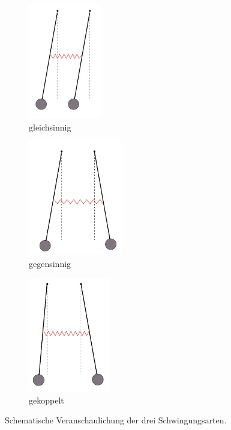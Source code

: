 \begin{figure}
    \begin{subfigure}{0.31\textwidth}
      \centering
      \includegraphics[height=5cm]{content/Bilder/Gleichsinnig.png}
      \caption{gleichsinnig}
      \label{fig:gleichsinnig}
    \end{subfigure}
    \hfill
    \begin{subfigure}{0.31\textwidth}
      \centering
      \includegraphics[height=5cm]{content/Bilder/Gegensinnig.png}
      \caption{gegensinnig}
      \label{fig:gegensinnig}
    \end{subfigure}
    \hfill
    \begin{subfigure}{0.31\textwidth}
      \centering
      \includegraphics[height=5cm]{content/Bilder/Gekoppelt.png}
      \caption{gekoppelt}
      \label{fig:gekoppelt}
    \end{subfigure}
    \caption{Schematische Veranschaulichung der drei Schwingungsarten.}
    \label{fig:Schema Schwingungsarten}
  \end{figure}